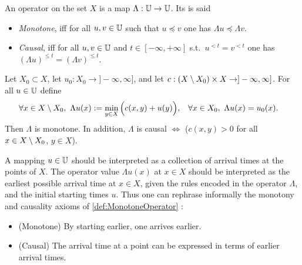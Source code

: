 \begin{definition}
\label{def:MonotoneOperator}
	An operator on the set $X$ is a map $\Lambda : \mathbb{U} \to \mathbb{U}$. Its is said 
	\begin{itemize}
	\item \emph{Monotone}, iff for all $u,v \in \mathbb{U}$ 
	such that $u \preceq v$ one has $\Lambda u \preceq \Lambda v$.
	\item \emph{Causal}, iff for all $u,v \in \mathbb{U}$ and $t \in [-\infty,+\infty]$ 
	s.t.\ $u^{<t} = v^{<t}$ one has $ (\Lambda u)^{\leq t} = (\Lambda v)^{\leq t}$.
	\end{itemize}
\end{definition}


\begin{proposition}
\label{prop:graph_operator}
Let $X_0 \subset X$, let $u_0 : X_0 \to ]-\infty,\infty]$, and let $c : (X\setminus X_0) \times X \to ]-\infty,\infty]$. For all $u\in \mathbb{U}$ define 
\begin{align}
\label{eq:graph_operator}
	\forall x &\in X \sm X_0,\ 
	\Lambda u(x) := \min_{y \in X} \Big(c(x,y) + u(y)\Big), &
	\forall x &\in X_0,\ 
	\Lambda u(x) = u_0(x).
\end{align}
Then $\Lambda$ is monotone. In addition, $\Lambda$ is causal $\Leftrightarrow$ ($c(x,y) > 0$ for all $x \in X\setminus X_0$, $y \in X$). 	
\end{proposition}



\begin{remark}
A mapping $u \in \mathbb{U}$ should be interpreted as a collection of arrival times at the points of $X$. 
The operator value $\Lambda u(x)$ at $x \in X$ should be interpreted as the earliest possible arrival time at $x\in X$, given the rules encoded in the operator $\Lambda$, and the initial starting times $u$.
Thus one can rephrase informally the monotony and causality axioms of \cref{def:MonotoneOperator} : 
\begin{itemize}
	\item (Monotone) By starting earlier, one arrives earlier.
	\item (Causal) The arrival time at a point can be expressed in terms of earlier arrival times.
\end{itemize}
\end{remark}

